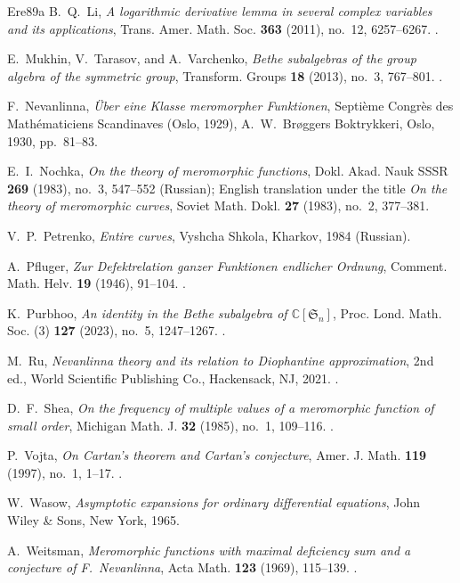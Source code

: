 \documentclass[11pt,letterpaper,reqno]{amsart}
\theoremstyle{remark}
\numberwithin{equation}{section}
\newcommand{\C}{\mathbb C}
\begin{document}
\begin{thebibliography}{Ere89a}
B.~Q.~Li,
\emph{A logarithmic derivative lemma in several complex variables and its applications},
Trans. Amer. Math. Soc. \textbf{363} (2011), no.~12, 6257--6267.
.

E.~Mukhin, V.~Tarasov, and A.~Varchenko,
\emph{Bethe subalgebras of the group algebra of the symmetric group},
Transform. Groups \textbf{18} (2013), no.~3, 767--801.
.

F.~Nevanlinna,
\emph{\"Uber eine Klasse meromorpher Funktionen},
Septi\`eme Congr\`es des Math\'ematiciens Scandinaves
(Oslo, 1929), A.~W.~Br\o ggers Boktrykkeri, Oslo, 1930, pp.~81--83.

E.~I.~Nochka,
\emph{On the theory of meromorphic functions},
Dokl. Akad. Nauk SSSR \textbf{269} (1983), no.~3, 547--552 (Russian);
English translation under the title \emph{On the theory of meromorphic curves},
Soviet Math. Dokl. \textbf{27} (1983), no.~2, 377--381.

V.~P.~Petrenko,
\emph{Entire curves},
Vyshcha Shkola, Kharkov, 1984 (Russian).

A.~Pfluger,
\emph{Zur Defektrelation ganzer Funktionen endlicher Ordnung},
Comment. Math. Helv. \textbf{19} (1946), 91--104.
.

K.~Purbhoo,
\emph{An identity in the Bethe subalgebra of $\C[\mathfrak S_n]$},
Proc. Lond. Math. Soc. (3) \textbf{127} (2023), no.~5, 1247--1267.
.

M.~Ru,
\emph{Nevanlinna theory and its relation to Diophantine approximation},
2nd ed., World Scientific Publishing Co., Hackensack, NJ, 2021.
.

D.~F.~Shea,
\emph{On the frequency of multiple values of a meromorphic function of
small order},
Michigan Math. J. \textbf{32} (1985), no.~1, 109--116.
.

P.~Vojta,
\emph{On Cartan's theorem and Cartan's conjecture},
Amer. J. Math. \textbf{119} (1997), no.~1, 1--17.
.

W.~Wasow,
\emph{Asymptotic expansions for ordinary differential equations},
John Wiley \& Sons, New York, 1965.

A.~Weitsman,
\emph{Meromorphic functions with maximal deficiency sum and a conjecture
of F.~Nevanlinna},
Acta Math. \textbf{123} (1969), 115--139.
.

\end{thebibliography}
\end{document}
